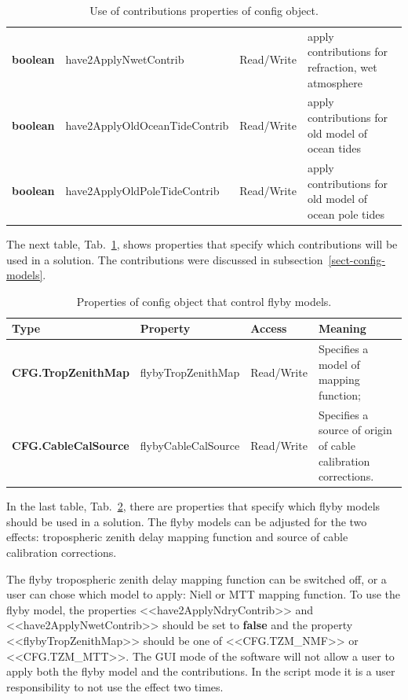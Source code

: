 \documentclass [10pt,letterpaper]{report}
\begin{document}
\begin{table}[htb]
\begin{tabular}{lllp{}}
  {\bf boolean} & have2ApplyNwetContrib & Read/Write & apply contributions for refraction, wet atmosphere\\
  {\bf boolean} & have2ApplyOldOceanTideContrib & Read/Write & apply contributions for old model of ocean tides\\
  {\bf boolean} & have2ApplyOldPoleTideContrib & Read/Write & apply contributions for old model of ocean pole tides\\
\hline
\end{tabular}
\caption{Use of contributions properties of config object.}
\label{tab-scr-config-properties-5}
\end{table}

The next table, Tab.~\ref{tab-scr-config-properties-5}, shows properties that specify which
contributions will be used in a solution. The contributions were discussed in subsection~\ref{sect-config-models}.

\begin{table}[htb]
\centering
\footnotesize
\begin{tabular}{lllp{}}
\hline
Type & Property & Access & Meaning\\
\hline
  {\bf CFG.TropZenithMap}  & flybyTropZenithMap  & Read/Write & Specifies a model of mapping function;\\
  {\bf CFG.CableCalSource} & flybyCableCalSource & Read/Write & Specifies a source of origin of cable calibration corrections.\\
\hline
\end{tabular}
\caption{Properties of config object that control flyby models.}
\label{tab-scr-config-properties-6}
\end{table}

In the last table, Tab.~\ref{tab-scr-config-properties-6}, there are properties that specify which
flyby models should be used in a solution. The flyby models can be adjusted for the
two effects: tropospheric zenith delay mapping function and source of cable calibration corrections.

The flyby tropospheric zenith delay mapping function can be switched off, or a user can chose
which model to apply: Niell \cite{Niell1996} or MTT \cite{Herring1992} mapping function. To use the
flyby model, the properties <<have2ApplyNdryContrib>> and <<have2ApplyNwetContrib>> should be set to
{\bf false} and the property <<flybyTropZenithMap>> should be one of <<CFG.TZM\_NMF>> or <<CFG.TZM\_MTT>>.
The GUI mode of the software will not allow a user to apply both the flyby model and the contributions.
In the script mode it is a user responsibility to not use the effect two times.
\end{document}
